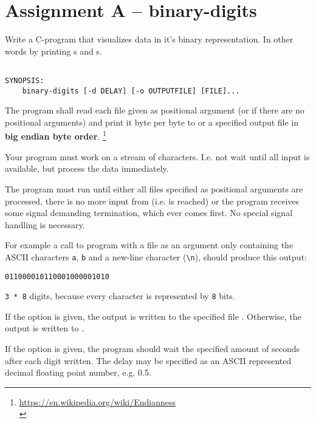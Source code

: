 




\section*{Assignment A -- binary-digits}

Write a C-program that visualizes data in it's binary representation.
In other words by printing s and s.

\begin{verbatim}

SYNOPSIS:
	binary-digits [-d DELAY] [-o OUTPUTFILE] [FILE]...

\end{verbatim}


The program shall read each file given as positional argument
(or  if there are no positional arguments)
and print it byte per byte to  or a specified output file in \textbf{big endian byte order}.
\footnote{
	\url{https://en.wikipedia.org/wiki/Endianness}\\
}

Your program must work on a stream of characters.
I.e. not wait until all input is available, but process
the data immediately.

The program must run until either all files specified as
positional arguments are processed, there is no more input
from  (i.e.  is reached)
or the program receives some signal demanding termination,
which ever comes first.
No special signal handling is necessary.

For example a call to program with a file as an argument
only containing the ASCII characters \verb|a|, \verb|b|
and a new-line character (\verb|\n|), should produce this
output:

\verb|011000010110001000001010|

\verb|3 * 8| digits, because every character is represented
by \verb|8| bits.

If the option  is given,
the output is written to the specified file .
Otherwise, the output is written to .

If the option  is given,
the program should wait the specified amount of seconds after each
digit written.
The delay may be specified as an ASCII represented decimal floating point number, e.g. 0.5.

